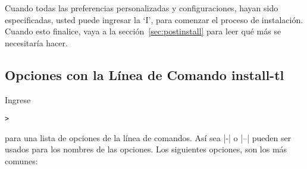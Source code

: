 \documentclass{article}
\begin{document}
Cuando todas las preferencias personalizadas y configuraciones, hayan
sido especificadas, usted puede ingresar la `I', para comenzar el
proceso de instalación.  Cuando esto finalice, vaya a la
sección~\ref{sec:postinstall} para leer qué más se necesitaría hacer. 

\subsection{Opciones con la Línea de Comando install-tl}
\label{sec:cmdline}

Ingrese 
\begin{alltt}
	> 
\end{alltt}
para una lista de opciones de la línea de comandos. Así sea |-| o |--|
pueden ser usados para los nombres de las opciones. Los
siguientes opciones, son los más comunes:
\end{document}

